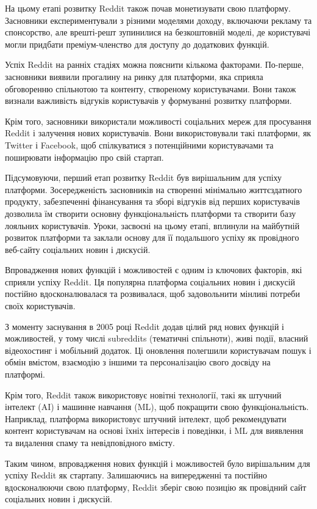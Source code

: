 \documentclass[oneside,14pt]{extarticle}
\begin{document}
На цьому етапі розвитку Reddit також почав монетизувати свою платформу. Засновники експериментували з різними моделями доходу, включаючи рекламу та спонсорство, але врешті-решт зупинилися на безкоштовній моделі, де користувачі могли придбати преміум-членство для доступу до додаткових функцій.

Успіх Reddit на ранніх стадіях можна пояснити кількома факторами. По-перше, засновники виявили прогалину на ринку для платформи, яка сприяла обговоренню спільнотою та контенту, створеному користувачами. Вони також визнали важливість відгуків користувачів у формуванні розвитку платформи.

Крім того, засновники використали можливості соціальних мереж для просування Reddit і залучення нових користувачів. Вони використовували такі платформи, як Twitter і Facebook, щоб спілкуватися з потенційними користувачами та поширювати інформацію про свій стартап.

Підсумовуючи, перший етап розвитку Reddit був вирішальним для успіху платформи. Зосередженість засновників на створенні мінімально життєздатного продукту, забезпеченні фінансування та зборі відгуків від перших користувачів дозволила їм створити основну функціональність платформи та створити базу лояльних користувачів. Уроки, засвоєні на цьому етапі, вплинули на майбутній розвиток платформи та заклали основу для її подальшого успіху як провідного веб-сайту соціальних новин і дискусій.

Впровадження нових функцій і можливостей є одним із ключових факторів, які сприяли успіху Reddit. Ця популярна платформа соціальних новин і дискусій постійно вдосконалювалася та розвивалася, щоб задовольнити мінливі потреби своїх користувачів.

З моменту заснування в 2005 році Reddit додав цілий ряд нових функцій і можливостей, у тому числі subreddits (тематичні спільноти), живі події, власний відеохостинг і мобільний додаток. Ці оновлення полегшили користувачам пошук і обмін вмістом, взаємодію з іншими та персоналізацію свого досвіду на платформі.

Крім того, Reddit також використовує новітні технології, такі як штучний інтелект (AI) і машинне навчання (ML), щоб покращити свою функціональність. Наприклад, платформа використовує штучний інтелект, щоб рекомендувати контент користувачам на основі їхніх інтересів і поведінки, і ML для виявлення та видалення спаму та невідповідного вмісту.

Таким чином, впровадження нових функцій і можливостей було вирішальним для успіху Reddit як стартапу. Залишаючись на випередженні та постійно вдосконалюючи свою платформу, Reddit зберіг свою позицію як провідний сайт соціальних новин і дискусій.
\end{document}
